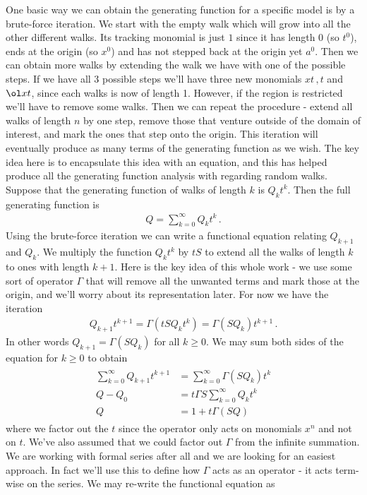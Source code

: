 One basic way we can obtain the generating function for a specific model is by a brute-force iteration. We start with the empty walk which will grow into all the other different walks. Its tracking monomial is just $1$ since it has length $0$ (so $t^0$), ends at the origin (so $x^0$) and has not stepped back at the origin yet $a^0$. Then we can obtain more walks by extending the walk we have with one of the possible steps. If we have all 3 possible steps we'll have three new monomials $xt\,,t$ and $\ol xt$, since each walks is now of length 1. However, if the region is restricted we'll have to remove some walks. Then we can repeat the procedure - extend all walks of length $n$ by one step, remove those that venture outside of the domain of interest, and mark the ones that step onto the origin. This iteration will eventually produce as many terms of the generating function as we wish. The key idea here is to encapsulate this idea with an equation, and this has helped produce all the generating function analysis with regarding random walks. Suppose that the generating function of walks of length $k$ is $Q_kt^k$. Then the full generating function is
\begin{align}
	Q = \sum_{k=0}^\infty Q_k t^k\,.
\end{align}
Using the brute-force iteration we can write a functional equation relating $Q_{k+1}$ and $Q_k$. We multiply the function $Q_kt^k$ by $tS$ to extend all the walks of length $k$ to ones with length $k+1$. Here is the key idea of this whole work - we use some sort of operator $\Gamma$ that will remove all the unwanted terms and mark those at the origin, and we'll worry about its representation later. For now we have the iteration
\begin{align}
	Q_{k+1}t^{k+1} = \Gamma (tS Q_k t^k) = \Gamma(SQ_k)t^{k+1}\,.
\end{align}
In other words $Q_{k+1} = \Gamma (SQ_k)$ for all $k\ge 0$. We may sum both sides of the equation for $k\ge 0$ to obtain
\begin{align}
\begin{split}
	\sum_{k=0}^\infty Q_{k+1}t^{k+1} &= \sum_{k=0}^\infty\Gamma (SQ_k)t^k\\
	Q - Q_0 &= t\Gamma  S\sum_{k=0}^\infty Q_kt^k\\
	Q &= 1 + t\Gamma (SQ)
\end{split}
\end{align}
where we factor out the $t$ since the operator only acts on monomials $x^n$ and not on $t$. We've also assumed that we could factor out $\Gamma$ from the infinite summation. We are working with formal series after all and we are looking for an easiest approach. In fact we'll use this to define how $\Gamma$ acts as an operator - it acts term-wise on the series. We may re-write the functional equation as
